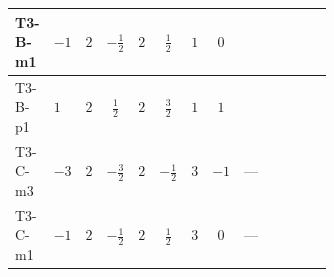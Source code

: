 \documentclass[8pt]{article}
\begin{document}
\begin{landscape}
\begin{longtable}{@{}llcccccc >{\raggedright\arraybackslash}p{0.21\linewidth} >{\raggedright\arraybackslash}p{0.21\linewidth} >{\raggedright\arraybackslash}p{0.21\linewidth}@{}}
\midrule
T3-B-m1 & $-1$ & $2$ & $-\frac{1}{2}$ & $2$ & $\frac{1}{2}$ & $1$ & $0$ & \scriptsize\adjustbox{max width=\linewidth}{$\begin{gathered} {\lambda_{12}^{(A)}} (2 T_{\nu}^{(1)}+2 T_{\nu}^{(2)})\end{gathered}$} & \scriptsize\adjustbox{max width=\linewidth}{$\begin{gathered} -\frac{8}{3} \operatorname{Tr}\!\left({y_1}\,\left({y_1}\right)^{\dagger}\,{y_2}\,\left({y_2}\right)^{\dagger}\right)\end{gathered}$} & \scriptsize\adjustbox{max width=\linewidth}{$\begin{gathered} +\frac{4}{3} {\lambda_5} \left({\lambda_5}\right)^{*}\end{gathered}$} \\
\midrule
T3-B-p1 & $1$ & $2$ & $\frac{1}{2}$ & $2$ & $\frac{3}{2}$ & $1$ & $1$ & \scriptsize\adjustbox{max width=\linewidth}{$\begin{gathered} {\lambda_{12}^{(A)}} (2 T_{\nu}^{(1)}+2 T_{\nu}^{(2)})\end{gathered}$} & \scriptsize\adjustbox{max width=\linewidth}{$\begin{gathered} -\frac{8}{3} \operatorname{Tr}\!\left({y_1}\,\left({y_1}\right)^{\dagger}\,{y_2}\,\left({y_2}\right)^{\dagger}\right)\end{gathered}$} & \scriptsize\adjustbox{max width=\linewidth}{$\begin{gathered} +\frac{4}{3} {\lambda_5} \left({\lambda_5}\right)^{*}\end{gathered}$} \\
\midrule
T3-C-m3 & $-3$ & $2$ & $-\frac{3}{2}$ & $2$ & $-\frac{1}{2}$ & $3$ & $-1$ & --- & \scriptsize\adjustbox{max width=\linewidth}{$\begin{gathered} -\frac{2}{3} \operatorname{Tr}\!\left({y_1}\,\left({y_1}\right)^{\dagger}\,{y_2}\,\left({y_2}\right)^{\dagger}\right)\end{gathered}$} & \scriptsize\adjustbox{max width=\linewidth}{$\begin{gathered} +\frac{4}{3} {\lambda_5} \left({\lambda_5}\right)^{*}\end{gathered}$} \\
\midrule
T3-C-m1 & $-1$ & $2$ & $-\frac{1}{2}$ & $2$ & $\frac{1}{2}$ & $3$ & $0$ & --- & \scriptsize\adjustbox{max width=\linewidth}{$\begin{gathered} -\frac{2}{3} \operatorname{Tr}\!\left({y_1}\,\left({y_1}\right)^{\dagger}\,{y_2}\,\left({y_2}\right)^{\dagger}\right)\end{gathered}$} & \scriptsize\adjustbox{max width=\linewidth}{$\begin{gathered} +\frac{4}{3} {\lambda_5} \left({\lambda_5}\right)^{*}\end{gathered}$} \\

\end{longtable}
\end{landscape}
\end{document}

